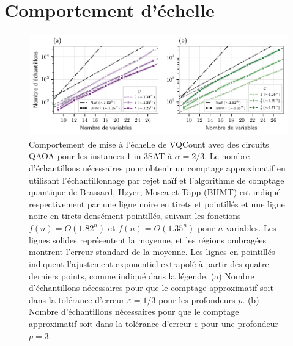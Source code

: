 \section{Comportement d'échelle}
\label{sec:comportement-echelle}

\begin{figure}[ht!]
    \centering
    \includegraphics[width=1\textwidth]{figures/1in3sat-number-of-samples.pdf}
    \caption[Comportement d'échelle du nombre d'échantillons pour \#1-in-3SAT]{Comportement de mise à l'échelle de VQCount avec des circuits QAOA pour les instances 1-in-3SAT à $\alpha=2/3$. Le nombre d'échantillons nécessaires pour obtenir un comptage approximatif en utilisant l'échantillonnage par rejet naïf et l'algorithme de comptage quantique de Brassard, Høyer, Mosca et Tapp (BHMT) est indiqué respectivement par une ligne noire en tirets et pointillés et une ligne noire en tirets densément pointillés, suivant les fonctions $f(n) = O(1.82^{n})$ et $f(n) = O(1.35^{n})$ pour $n$ variables. Les lignes solides représentent la moyenne, et les régions ombragées montrent l'erreur standard de la moyenne. Les lignes en pointillés indiquent l'ajustement exponentiel extrapolé à partir des quatre derniers points, comme indiqué dans la légende. (a) Nombre d'échantillons nécessaires pour que le comptage approximatif soit dans la tolérance d'erreur $\varepsilon = 1/3$ pour les profondeurs $p$. (b) Nombre d'échantillons nécessaires pour que le comptage approximatif soit dans la tolérance d'erreur $\varepsilon$ pour une profondeur $p=3$.}
    \label{fig:1in3sat-number-of-samples}
\end{figure}

